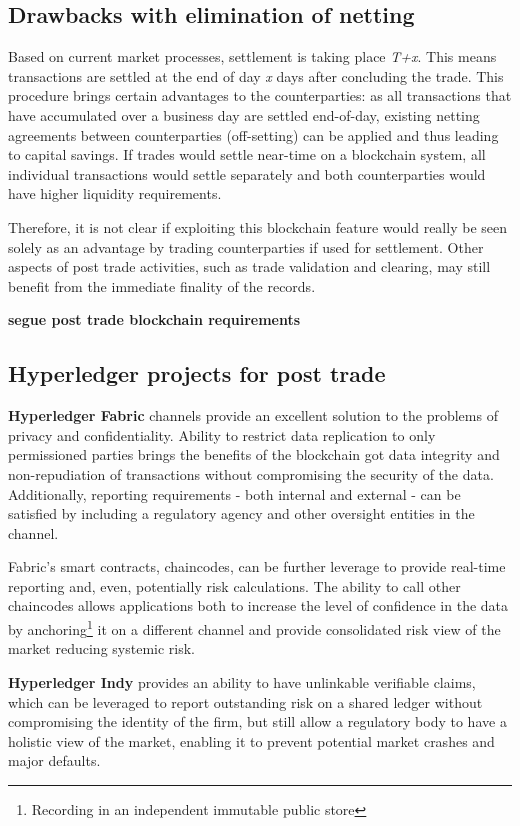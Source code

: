 \subsection{Drawbacks with elimination of netting}
Based on current market processes, settlement is taking place \emph{T+x}. This means transactions are settled at the end of day \emph{x} days after concluding the trade. This procedure brings certain advantages to the counterparties: as all transactions that have accumulated over a business day are settled end-of-day, existing netting agreements between counterparties (off-setting) can be applied and thus leading to capital savings. If trades would settle near-time on a blockchain system, all individual transactions would settle separately and both counterparties would have higher liquidity requirements.

Therefore, it is not clear if exploiting this blockchain feature would really be seen solely as an advantage by trading counterparties if used for settlement. Other aspects of post trade activities, such as trade validation and clearing, may still benefit from the immediate finality of the records. 

\textbf{segue post trade blockchain requirements}

\subsection{Hyperledger projects for post trade}
\textbf{Hyperledger Fabric} channels provide an excellent solution to the problems of privacy and confidentiality. Ability to restrict data replication to only permissioned parties brings the benefits of the blockchain got data integrity and non-repudiation of transactions without compromising the security of the data. Additionally, reporting requirements - both internal and external - can be satisfied by including a regulatory agency and other oversight entities in the channel.

Fabric's smart contracts, chaincodes, can be further leverage to provide real-time reporting and, even, potentially risk calculations. The ability to call other chaincodes allows applications both to increase the level of confidence in the data by anchoring\footnote{Recording in an independent immutable public store} it on a different channel and provide consolidated risk view of the market reducing systemic risk.

\textbf{Hyperledger Indy} provides an ability to have unlinkable verifiable claims, which can be leveraged to report outstanding risk on a shared ledger without compromising the identity of the firm, but still allow a regulatory body to have a holistic view of the market, enabling it to prevent potential market crashes and major defaults.
